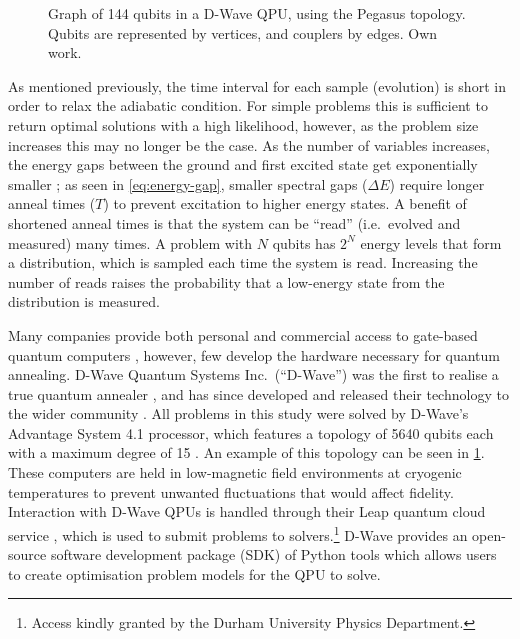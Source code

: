 \documentclass[twocolumn]{article}
\theoremstyle{definition}
\begin{document}
\begin{figure}[t]
    \centering
    
    \caption{Graph of \num{144} qubits in a D-Wave QPU, using the Pegasus topology. Qubits are represented by vertices, and couplers by edges. Own work.}
    \label{fig:pegasus}
\end{figure}

As mentioned previously, the time interval for each sample (evolution) is short in order to relax the adiabatic condition. For simple problems this is sufficient to return optimal solutions with a high likelihood, however, as the problem size increases this may no longer be the case. As the number of variables increases, the energy gaps between the ground and first excited state get exponentially smaller \cite{bapst_quantum_2013}; as seen in \cref{eq:energy-gap}, smaller spectral gaps ($\Delta E$) require longer anneal times ($T$) to prevent excitation to higher energy states.
A benefit of shortened anneal times is that the system can be ``read'' (i.e.\ evolved and measured) many times. A problem with $N$ qubits has $2^N$ energy levels that form a distribution, which is sampled each time the system is read. Increasing the number of reads raises the probability that a low-energy state from the distribution is measured.

Many companies provide both personal and commercial access to gate-based quantum computers \cites{google}{ibm}, however, few develop the hardware necessary for quantum annealing. D-Wave Quantum Systems Inc.\ (``D-Wave'') was the first to realise a true quantum annealer \cite{johnson_quantum_2011}, and has since developed and released their technology to the wider community \cite{finley_quantum_2017}. All problems in this study were solved by D-Wave's Advantage System 4.1 processor, which features a topology of \num{5640} qubits each with a maximum degree of \num{15} \cite{dwave_topology}. An example of this topology can be seen in \cref{fig:pegasus}. These computers are held in low-magnetic field environments at cryogenic temperatures to prevent unwanted fluctuations that would affect fidelity.
Interaction with D-Wave QPUs is handled through their Leap quantum cloud service \cite{dwave_leap}, which is used to submit problems to solvers.\footnote{Access kindly granted by the Durham University Physics Department.} D-Wave provides an open-source software development package (SDK) of Python tools which allows users to create optimisation problem models for the QPU to solve.
\end{document}
